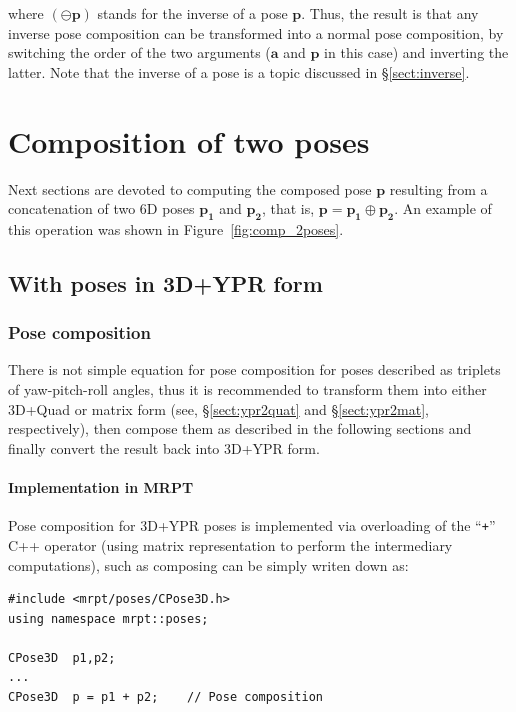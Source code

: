 \documentclass[a4paper,11pt]{report}
\begin{document}
\noindent where $(\ominus \mathbf{p})$ stands for the inverse of a pose $\mathbf{p}$.
Thus, the result is that any inverse pose composition can be transformed into a normal
pose composition, by switching the order of the two arguments
($\mathbf{a}$ and $\mathbf{p}$ in this case) and inverting the latter.
Note that the inverse of a pose is a topic discussed in \S \ref{sect:inverse}.


\chapter{Composition of two poses}
\label{ch:pose_pose_comp}

Next sections are devoted to computing the composed pose $\mathbf{p}$ resulting
from a concatenation of two 6D poses $\mathbf{p_1}$ and $\mathbf{p_2}$,
that is, $\mathbf{p} = \mathbf{p_1} \oplus \mathbf{p_2}$.
An example of this operation was shown in Figure~\ref{fig:comp_2poses}.

\section{With poses in 3D+YPR form}

\subsection{Pose composition}

There is not simple
equation for pose composition for poses described as triplets
of yaw-pitch-roll angles, thus it is recommended to transform them into
either 3D+Quad or matrix form
(see, \S \ref{sect:ypr2quat} and \S \ref{sect:ypr2mat}, respectively),
then compose them as described in the following sections and finally
convert the result back into 3D+YPR form.

\subsubsection{Implementation in MRPT}

Pose composition for 3D+YPR poses is implemented via overloading
of the ``\texttt{+}'' C++ operator
(using matrix representation to perform the intermediary computations),
such as composing can be simply
writen down as:

\begin{lstlisting}
#include <mrpt/poses/CPose3D.h>
using namespace mrpt::poses;

CPose3D  p1,p2;
...
CPose3D  p = p1 + p2;    // Pose composition
\end{lstlisting}
\end{document}
